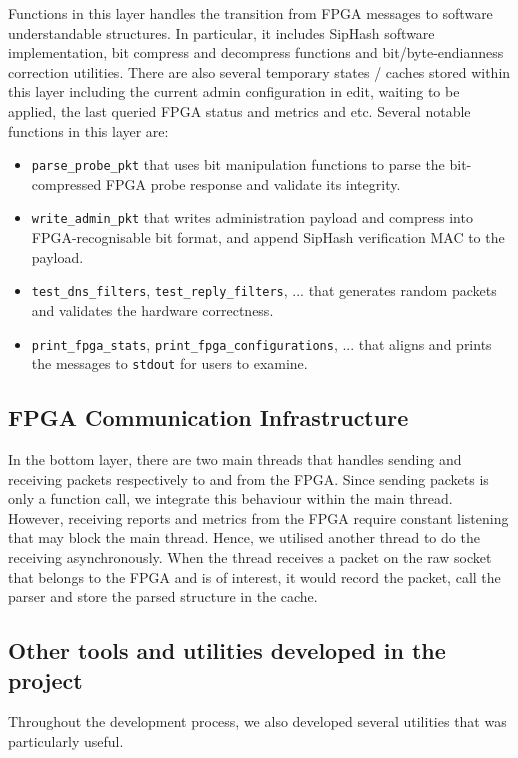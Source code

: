 \documentclass[a4paper]{report}
\newcommand{\code}{\texttt}
\begin{document}
Functions in this layer handles the transition from FPGA messages to software understandable structures. In particular, it includes SipHash software implementation, bit compress and decompress functions and bit/byte-endianness correction utilities. There are also several temporary states / caches stored within this layer including the current admin configuration in edit, waiting to be applied, the last queried FPGA status and metrics and etc. Several notable functions in this layer are:
\begin{itemize}
    \item \code{parse\_probe\_pkt} that uses bit manipulation functions to parse the bit-compressed FPGA probe response and validate its integrity.
    \item \code{write\_admin\_pkt} that writes administration payload and compress into FPGA-recognisable bit format, and append SipHash verification MAC to the payload.
    \item \code{test\_dns\_filters}, \code{test\_reply\_filters}, ... that generates random packets and validates the hardware correctness.
    \item \code{print\_fpga\_stats}, \code{print\_fpga\_configurations}, ... that aligns and prints the messages to \code{stdout} for users to examine.
\end{itemize}

\subsection{FPGA Communication Infrastructure}

In the bottom layer, there are two main threads that handles sending and receiving packets respectively to and from the FPGA. Since sending packets is only a function call, we integrate this behaviour within the main thread. However, receiving reports and metrics from the FPGA require constant listening that may block the main thread. Hence, we utilised another thread to do the receiving asynchronously. When the thread receives a packet on the raw socket that belongs to the FPGA and is of interest, it would record the packet, call the parser and store the parsed structure in the cache.

\subsection{Other tools and utilities developed in the project}

Throughout the development process, we also developed several utilities that was particularly useful. 
\end{document}
